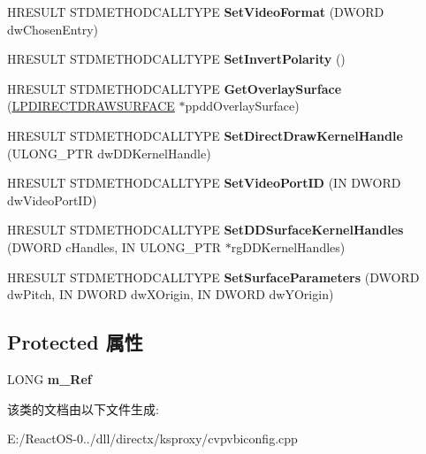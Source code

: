 \begin{DoxyCompactItemize}
H\+R\+E\+S\+U\+LT S\+T\+D\+M\+E\+T\+H\+O\+D\+C\+A\+L\+L\+T\+Y\+PE {\bfseries Set\+Video\+Format} (D\+W\+O\+RD dw\+Chosen\+Entry)
\item 
\mbox{\label{class_c_v_p_v_b_i_config_a973b9bf7f993355f081d764d5d6dae00}} 
H\+R\+E\+S\+U\+LT S\+T\+D\+M\+E\+T\+H\+O\+D\+C\+A\+L\+L\+T\+Y\+PE {\bfseries Set\+Invert\+Polarity} ()
\item 
\mbox{\label{class_c_v_p_v_b_i_config_a4c00989b40b4bb9693108b39cd1c17ea}} 
H\+R\+E\+S\+U\+LT S\+T\+D\+M\+E\+T\+H\+O\+D\+C\+A\+L\+L\+T\+Y\+PE {\bfseries Get\+Overlay\+Surface} (\hyperlink{interfacevoid}{L\+P\+D\+I\+R\+E\+C\+T\+D\+R\+A\+W\+S\+U\+R\+F\+A\+CE} $\ast$ppdd\+Overlay\+Surface)
\item 
\mbox{\label{class_c_v_p_v_b_i_config_a2cb5ac6bb66284048622ffb472a68cf0}} 
H\+R\+E\+S\+U\+LT S\+T\+D\+M\+E\+T\+H\+O\+D\+C\+A\+L\+L\+T\+Y\+PE {\bfseries Set\+Direct\+Draw\+Kernel\+Handle} (U\+L\+O\+N\+G\+\_\+\+P\+TR dw\+D\+D\+Kernel\+Handle)
\item 
\mbox{\label{class_c_v_p_v_b_i_config_afd4cd1e8af41cc2fe5ce3d8f9b756d93}} 
H\+R\+E\+S\+U\+LT S\+T\+D\+M\+E\+T\+H\+O\+D\+C\+A\+L\+L\+T\+Y\+PE {\bfseries Set\+Video\+Port\+ID} (IN D\+W\+O\+RD dw\+Video\+Port\+ID)
\item 
\mbox{\label{class_c_v_p_v_b_i_config_a9d91eddd52a523865a9916d5cf2d3108}} 
H\+R\+E\+S\+U\+LT S\+T\+D\+M\+E\+T\+H\+O\+D\+C\+A\+L\+L\+T\+Y\+PE {\bfseries Set\+D\+D\+Surface\+Kernel\+Handles} (D\+W\+O\+RD c\+Handles, IN U\+L\+O\+N\+G\+\_\+\+P\+TR $\ast$rg\+D\+D\+Kernel\+Handles)
\item 
\mbox{\label{class_c_v_p_v_b_i_config_a3d47ccb8673f35ed3ad9b7b13e29f210}} 
H\+R\+E\+S\+U\+LT S\+T\+D\+M\+E\+T\+H\+O\+D\+C\+A\+L\+L\+T\+Y\+PE {\bfseries Set\+Surface\+Parameters} (D\+W\+O\+RD dw\+Pitch, IN D\+W\+O\+RD dw\+X\+Origin, IN D\+W\+O\+RD dw\+Y\+Origin)
\end{DoxyCompactItemize}
\subsection*{Protected 属性}
\begin{DoxyCompactItemize}
\item 
\mbox{\label{class_c_v_p_v_b_i_config_a4d78c0b63533386d42e9d95f7005cf1c}} 
L\+O\+NG {\bfseries m\+\_\+\+Ref}
\end{DoxyCompactItemize}


该类的文档由以下文件生成\+:\begin{DoxyCompactItemize}
\item 
E\+:/\+React\+O\+S-\/0../dll/directx/ksproxy/cvpvbiconfig.\+cpp\end{DoxyCompactItemize}
